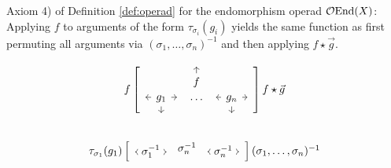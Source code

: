 \documentclass{article}
\begin{document}
Axiom 4) of Definition \ref{def:operad} for the endomorphism operad $\mathcal{O}\textup{End}(X)$: Applying $f$ to arguments of the form $\tau_{\sigma_i}(g_i)$ yields the same function as first permuting all arguments via $(\sigma_1,\ldots,\sigma_{n})^{-1}$ and then applying $f \star \vec{g}$.

\[
\begin{tikzcd}[column sep=small]
f \left[ \begin{array}{c}
\begin{tikzpicture}[baseline=(current bounding box.center)]
\node (a) at (0,0) {$f$};
\draw[->] (a) -- ++(0,0.5);
\end{tikzpicture} \\
\begin{tikzpicture}[baseline=(current bounding box.center)]
\node (a) at (0,0) {$g_1$};
\draw[->] (a) -- ++(0,-0.5);
\draw[->] (a) -- ++(-0.5,0);
\draw[->] (a) -- ++(0.5,0);
\end{tikzpicture} \quad \cdots \quad 
\begin{tikzpicture}[baseline=(current bounding box.center)]
\node (a) at (0,0) {$g_n$};
\draw[->] (a) -- ++(0,-0.5);
\draw[->] (a) -- ++(-0.5,0);
\draw[->] (a) -- ++(0.5,0);
\end{tikzpicture}
\end{array} \right] f \star \vec{g} \\
\tau_{\sigma_1}(g_1) \left[ \begin{array}{c}
\begin{tikzpicture}[baseline=(current bounding box.center)]
\node (a) at (0,0) {$\sigma_1^{-1}$};
\draw[->] (a) -- ++(-0.5,0);
\draw[->] (a) -- ++(0.5,0);
\end{tikzpicture} \quad \sigma_n^{-1} \quad 
\begin{tikzpicture}[baseline=(current bounding box.center)]
\node (a) at (0,0) {$\sigma_n^{-1}$};
\draw[->] (a) -- ++(-0.5,0);
\draw[->] (a) -- ++(0.5,0);
\end{tikzpicture}
\end{array} \right] (\sigma_1,\ldots,\sigma_n)^{-1}
\end{tikzcd}
\]
\end{document}
